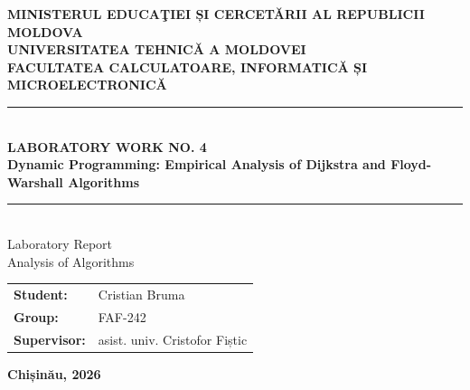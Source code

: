 \documentclass[12pt, a4paper]{report}
\newcommand{\ReportTitle}{Laboratory Work No. 4}
\newcommand{\ReportSubtitle}{Dynamic Programming: Empirical Analysis of Dijkstra and Floyd-Warshall Algorithms}
\newcommand{\StudentName}{Cristian Bruma}
\newcommand{\GroupName}{FAF-242}
\newcommand{\SupervisorName}{asist. univ. Cristofor Fiștic}
\newcommand{\Ministry}{Ministerul Educaţiei și Cercetării al Republicii Moldova}
\newcommand{\UniversityName}{Universitatea Tehnică a Moldovei}
\newcommand{\DepartmentName}{Facultatea Calculatoare, Informatică și Microelectronică}
\newcommand{\AcademicYear}{2026}
\begin{document}
\begin{titlepage}
  \thispagestyle{empty}        %
  \begin{center}
    \textbf{\MakeUppercase{\Ministry}}\\[4pt]
    \textbf{\MakeUppercase{\UniversityName}}\\[4pt]
    \textbf{\MakeUppercase{\DepartmentName}}\\[40pt]

    \rule{\linewidth}{0.5pt}\\[6pt]
    {\Large\bfseries\MakeUppercase{\ReportTitle}}\\[4pt]
    {\large\bfseries\ReportSubtitle}\\[6pt]
    \rule{\linewidth}{0.5pt}\\[30pt]

    {\Large Laboratory Report}\\[4pt]
    {\Large Analysis of Algorithms}\\[60pt]
  \end{center}

  \begin{flushleft}
    \begin{tabular}{ll}
      \Large\textbf{Student:}    & \Large\StudentName \\
      \Large\textbf{Group:}      & \Large\GroupName   \\
      \Large\textbf{Supervisor:} & \Large\SupervisorName \\
    \end{tabular}
  \end{flushleft}

  \vfill
  \begin{center}
    \Large\textbf{Chișinău, \AcademicYear}
  \end{center}
\end{titlepage}

\setcounter{page}{1}

\newpage
\renewcommand{\contentsname}{TABLE OF CONTENTS}
\renewcommand{\cfttoctitlefont}{\hfill\fontsize{13pt}{15pt}\bfseries}
\renewcommand{\cftaftertoctitle}{\hfill}
\tableofcontents
\thispagestyle{plain}          %

\end{document}
